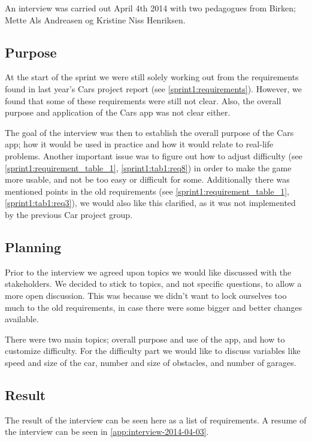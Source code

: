 An interview was carried out April 4th 2014 with two pedagogues from Birken; Mette Als Andreasen og Kristine Niss Henriksen.

\subsection{Purpose}
At the start of the sprint we were still solely working out from the requirements found in last year's Cars project report (see \cref{sprint1:requirements}).
However, we found that some of these requirements were still not clear.
Also, the overall purpose and application of the Cars app was not clear either.

The goal of the interview was then to establish the overall purpose of the Cars app; how it would be used in practice and how it would relate to real-life problems.
Another important issue was to figure out how to adjust difficulty (see \cref{sprint1:requirement_table_1}, \cref{sprint1:tab1:req8}) in order to make the game more usable, and not be too easy or difficult for some.
Additionally there was mentioned points in the old requirements (see \cref{sprint1:requirement_table_1}, \cref{sprint1:tab1:req3}), we would also like this clarified, as it was not implemented by the previous Car project group.

\subsection{Planning}
Prior to the interview we agreed upon topics we would like discussed with the stakeholders.
We decided to stick to topics, and not specific questions, to allow a more open discussion.
This was because we didn't want to lock ourselves too much to the old requirements, in case there were some bigger and better changes available.

There were two main topics; overall purpose and use of the app, and how to customize difficulty.
For the difficulty part we would like to discuss variables like speed and size of the car, number and size of obstacles, and number of garages.

\subsection{Result}
The result of the interview can be seen here as a list of requirements.
A resume of the interview can be seen in \cref{app:interview-2014-04-03}.

